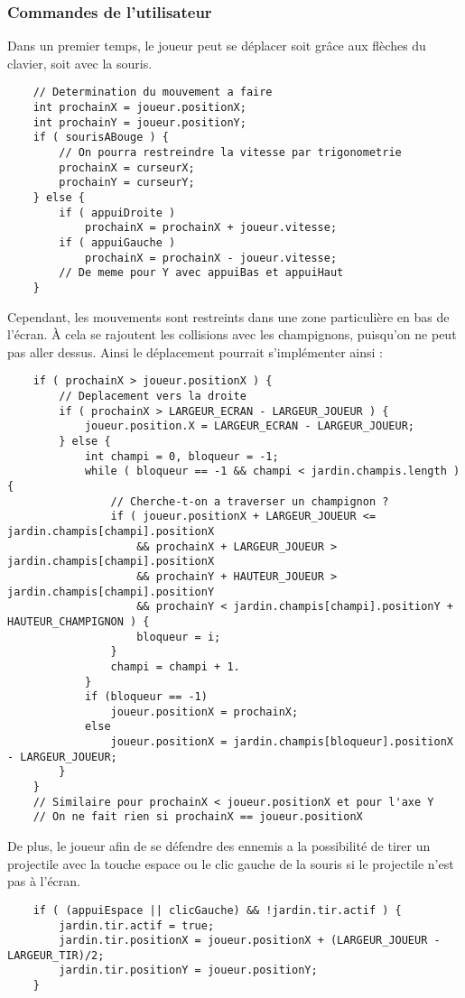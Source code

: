 \subsubsection{Commandes de l'utilisateur}
Dans un premier temps, le joueur peut se déplacer soit grâce aux flèches du clavier, soit avec la souris.
\begin{lstlisting}
	// Determination du mouvement a faire
	int prochainX = joueur.positionX;
	int prochainY = joueur.positionY;
	if ( sourisABouge ) {
		// On pourra restreindre la vitesse par trigonometrie
		prochainX = curseurX;
		prochainY = curseurY;
	} else {
		if ( appuiDroite )
			prochainX = prochainX + joueur.vitesse;
		if ( appuiGauche )
			prochainX = prochainX - joueur.vitesse;
		// De meme pour Y avec appuiBas et appuiHaut
	}
\end{lstlisting}

Cependant, les mouvements sont restreints dans une zone particulière en bas de l'écran. À cela se rajoutent les collisions avec les champignons, puisqu'on ne peut pas aller dessus. Ainsi le déplacement pourrait s'implémenter ainsi :
\begin{lstlisting}
	if ( prochainX > joueur.positionX ) {
		// Deplacement vers la droite
		if ( prochainX > LARGEUR_ECRAN - LARGEUR_JOUEUR ) {
			joueur.position.X = LARGEUR_ECRAN - LARGEUR_JOUEUR;
		} else {
			int champi = 0, bloqueur = -1;
			while ( bloqueur == -1 && champi < jardin.champis.length ) {
				// Cherche-t-on a traverser un champignon ?
				if ( joueur.positionX + LARGEUR_JOUEUR <= jardin.champis[champi].positionX
					&& prochainX + LARGEUR_JOUEUR > jardin.champis[champi].positionX
					&& prochainY + HAUTEUR_JOUEUR > jardin.champis[champi].positionY
					&& prochainY < jardin.champis[champi].positionY + HAUTEUR_CHAMPIGNON ) {
					bloqueur = i;
				}
				champi = champi + 1.
			}
			if (bloqueur == -1)
				joueur.positionX = prochainX;
			else
				joueur.positionX = jardin.champis[bloqueur].positionX - LARGEUR_JOUEUR;
		}
	}
	// Similaire pour prochainX < joueur.positionX et pour l'axe Y
	// On ne fait rien si prochainX == joueur.positionX
\end{lstlisting}

De plus, le joueur afin de se défendre des ennemis a la possibilité de tirer un projectile avec la touche espace ou le clic gauche de la souris si le projectile n'est pas à l'écran.
\begin{lstlisting}
	if ( (appuiEspace || clicGauche) && !jardin.tir.actif ) {
		jardin.tir.actif = true;
		jardin.tir.positionX = joueur.positionX + (LARGEUR_JOUEUR - LARGEUR_TIR)/2;
		jardin.tir.positionY = joueur.positionY;
	}
\end{lstlisting}

